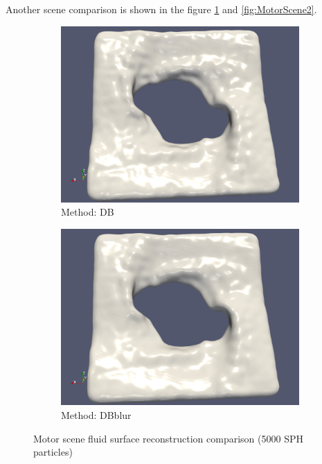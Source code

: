 Another scene comparison is shown in the figure \ref{fig:MotorScene1} and \ref{fig:MotorScene2}.
\begin{figure}
	\begin{center}
        \begin{subfigure}[b]{1\textwidth}
               \includegraphics[width=\textwidth]{figures/ReconstructionMotorSceneDencityBased.png}
				\caption{Method: DB}
        \end{subfigure}
        \begin{subfigure}[b]{1\textwidth}
               \includegraphics[width=\textwidth]{figures/ReconstructionMotorSceneDencityBasedBlur.png}
				\caption{Method: DBblur}
        \end{subfigure}
        \caption{Motor scene fluid surface reconstruction comparison (5000 SPH particles)}
        \label{fig:MotorScene1}
	\end{center}
\end{figure}
